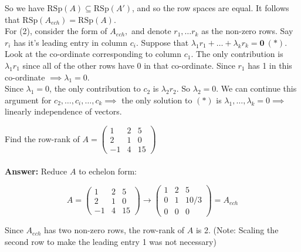 So we have $\text{RSp}(A) \subseteq \text{RSp}(A')$, and so the row spaces are equal. It follows that $\text{RSp}(A_{ech}) = \text{RSp}(A)$.\\

For (2), consider the form of $A_{ech},$ and denote $r_1,\dots r_k$ as the non-zero rows. Say $r_i$ has it's leading entry in column $c_i$. Suppose that $\lambda_1r_1 + \dots + \lambda_kr_k = \mathbf{0} ~(*).$\\
  
  Look at the co-ordinate corresponding to column $c_1$. The only contribution is $\lambda_1r_1$ since all of the other rows have 0 in that co-ordinate. Since $r_1$ has 1 in this co-ordinate $\implies \lambda_1 = 0$.\\

Since $\lambda_1 = 0$, the only contribution to $c_2$ is $\lambda_2r_2$. So $\lambda_2 = 0$. We can continue this argument for $c_2, \dots, c_i, \dots, c_k \implies$ the only solution to $(*)$ is $\lambda_1, \dots, \lambda_k = 0 \implies $ linearly independence of vectors.
  

\begin{example}  
Find the row-rank of $A = \begin{pmatrix}
 1 & 2 & 5\\ 2 & 1 & 0 \\ -1& 4 & 15
 \end{pmatrix}
$ \\~\\

\noindent \textbf{Answer:} Reduce $A$ to echelon form: 

\[A  = \begin{pmatrix}
 1 & 2 & 5\\ 2 & 1 & 0 \\ -1& 4 & 15
 \end{pmatrix} \to \begin{pmatrix}
1 & 2 & 5 \\ 0 & 1 & 10/3 \\ 0 & 0 & 0
\end{pmatrix} = A_{ech}\]

Since $A_{ech}$ has two non-zero rows, the row-rank of $A$ is 2. (Note: Scaling the second row to make the leading entry 1 was not necessary)
\end{example}\vspace*{10pt}

